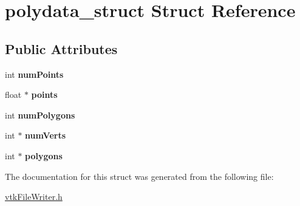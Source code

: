 \hypertarget{structpolydata__struct}{
\section{polydata\_\-struct Struct Reference}
\label{structpolydata__struct}
}
\subsection*{Public Attributes}
\begin{DoxyCompactItemize}
\item 
\hypertarget{structpolydata__struct_ada05c2a2c829ab6fd42a7a23711fcff9}{
int {\bfseries numPoints}}
\label{structpolydata__struct_ada05c2a2c829ab6fd42a7a23711fcff9}

\item 
\hypertarget{structpolydata__struct_a46bc71f6d6ba9972688f1409307b6be0}{
float $\ast$ {\bfseries points}}
\label{structpolydata__struct_a46bc71f6d6ba9972688f1409307b6be0}

\item 
\hypertarget{structpolydata__struct_aaa1983eb689f2ab212aa104ad709e57e}{
int {\bfseries numPolygons}}
\label{structpolydata__struct_aaa1983eb689f2ab212aa104ad709e57e}

\item 
\hypertarget{structpolydata__struct_a55510404a901cc9f550b6cae9e6b00be}{
int $\ast$ {\bfseries numVerts}}
\label{structpolydata__struct_a55510404a901cc9f550b6cae9e6b00be}

\item 
\hypertarget{structpolydata__struct_ae70b05682f5f61ffaa1ec64cd9192ec2}{
int $\ast$ {\bfseries polygons}}
\label{structpolydata__struct_ae70b05682f5f61ffaa1ec64cd9192ec2}

\end{DoxyCompactItemize}


The documentation for this struct was generated from the following file:\begin{DoxyCompactItemize}
\item 
\hyperlink{vtkFileWriter_8h}{vtkFileWriter.h}\end{DoxyCompactItemize}
